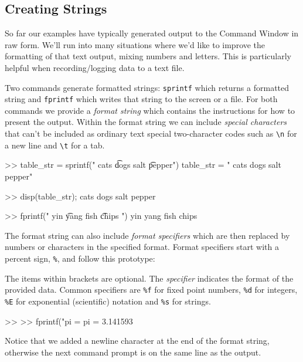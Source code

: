 \subsection{Creating Strings}

So far our examples have typically generated output to the Command Window in raw form.  We'll run into many situations where we'd like to improve the formatting of that text output, mixing numbers and letters.  This is particularly helpful when recording/logging data to a text file.

Two commands generate formatted strings: \lstinline{sprintf} which returns a formatted string 
and \lstinline{fprintf} which writes that string to the screen or a file.  For both commands we provide a \emph{format string} which contains the instructions for how to present the output.  Within the format string we can include \emph{special characters} that can't be included as ordinary text special two-character codes such as \lstinline{\n} for a new line and \lstinline{\t} for a tab.

\begin{code}
>> table_str = sprintf(" cats \t dogs \n salt \t pepper")
table_str = 
    " cats 	 dogs 
      salt 	 pepper"

>> disp(table_str);
 cats 	 dogs 
 salt 	 pepper

>> fprintf(" yin \t yang \n fish \t chips \n")
 yin 	 yang 
 fish 	 chips 
\end{code}

The format string can also include \emph{format specifiers} which are then replaced by numbers or characters in the specified format.  Format specifiers start with a percent sign, \lstinline{%}, and follow this prototype:
\begin{stdout}
\end{stdout}   
The items within brackets are optional.  The \emph{specifier} indicates the format of the provided data.  Common specifiers are \lstinline{%f} for fixed point numbers, \lstinline{%d} for integers, \lstinline{%E} for exponential (scientific) notation and \lstinline{%s} for strings.

\begin{code}
>> %
>> fprintf("pi = %
pi = 3.141593
\end{code}
Notice that we added a newline character at the end of the format string, otherwise the next command prompt is on the same line as the output.

